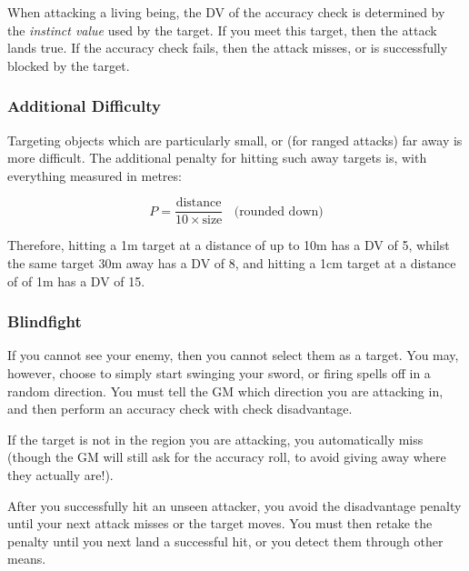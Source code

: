 When attacking a living being, the DV of the accuracy check is determined by the {\it instinct value} used by the target. If you meet this target, then the attack lands true. If the accuracy check fails, then the attack misses, or is successfully blocked by the target. 

\subsubsection{Additional Difficulty} \label{S:HardToHit}

Targeting objects which are particularly small, or (for ranged attacks) far away is more difficult.  The additional penalty for hitting such away targets is, with everything measured in metres:

$$ P = \frac{\text{distance}}{10 \times \text{size}} ~~~~ \text{(rounded down)}$$

Therefore, hitting a 1m target at a distance of up to 10m has a DV of 5, whilst the same target 30m away has a DV of 8, and hitting a 1cm target at a distance of of 1m has a DV of 15. 

\subsubsection{Blindfight}\label{S:Unseen}

If you cannot see your enemy, then you cannot select them as a target. You may, however, choose to simply start swinging your sword, or firing spells off in a random direction. You must tell the GM which direction you are attacking in, and then perform an accuracy check with check disadvantage.

If the target is not in the region  you are attacking, you automatically miss (though the GM will still ask for the accuracy roll, to avoid giving away where they actually are!). 

After you successfully hit an unseen attacker, you avoid the disadvantage penalty until your next attack misses or the target moves. You must then retake the penalty until you next land a successful hit, or you detect them through other means. 
